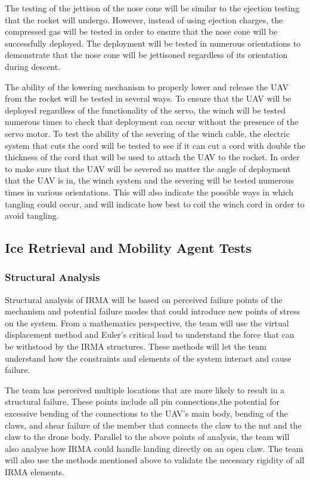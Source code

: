 	The testing of the jettison of the nose cone will be similar to the ejection testing that the rocket will undergo. However, instead of using ejection charges, the compressed gas will be tested in order to ensure that the nose cone will be successfully deployed. The deployment will be tested in numerous orientations to demonstrate that the nose cone will be jettisoned regardless of its orientation during descent. 
	
	The ability of the lowering mechanism to properly lower and release the UAV from the rocket will be tested in several ways. To ensure that the UAV will be deployed regardless of the functionality of the servo, the winch will be tested numerous times to check that deployment can occur without the presence of the servo motor. To test the ability of the severing of the winch cable, the electric system that cuts the cord will be tested to see if it can cut a cord with double the thickness of the cord that will be used to attach the UAV to the rocket. In order to make sure that the UAV will be severed no matter the angle of deployment that the UAV is in, the winch system and the severing will be tested numerous times in various orientations. This will also indicate the possible ways in which tangling could occur, and will indicate how best to coil the winch cord in order to avoid tangling. 
	

	\subsection{Ice Retrieval and Mobility Agent Tests}
		\subsubsection{Structural Analysis}
		Structural analysis of IRMA will be based on perceived failure points of the mechanism and potential failure modes that could introduce new points of stress on the system.  From a  mathematics perspective, the team will use the virtual displacement method and Euler’s critical load to understand the force that can be withstood by the IRMA structures.  These methods will let the team understand how the constraints and elements of the system interact and cause failure.

		The team has perceived multiple locations that are more likely to result in a structural failure.  These points include all pin connections,the potential for excessive bending of the connections to the UAV’s main body, bending of the claws, and shear failure of the member that connects the claw to the nut and the claw to the drone body.  Parallel to the above points of analysis, the team will also analyse how IRMA could handle landing directly on an open claw.  The team will also use the methods mentioned above to validate the necessary rigidity of all IRMA elements.
		

